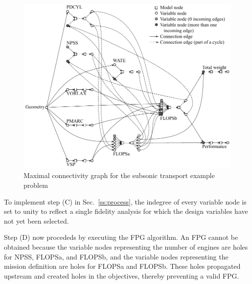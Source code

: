 	\begin{figure}[htb!]
	  \begin{center}
		\includegraphics[width=4.5in]{images/MCG_edit_holes}
	  \end{center}
	  \caption{Maximal connectivity graph for the subsonic transport example problem}
	\label{f:MCG holes}
	\end{figure}

To implement step (C) in Sec.~\ref{ss:process}, the indegree of every variable node is set to unity to reflect a single fidelity analysis for which the design variables have not yet been selected.


%

Step (D) now procededs by executing the FPG algorithm. An FPG cannot be obtained because the variable nodes representing the number of engines are holes for NPSS, FLOPSa, and FLOPSb, and the variable nodes representing the mission definition are holes for FLOPSa and FLOPSb. These holes propagated upstream and created holes in the objectives, thereby preventing a valid FPG.

